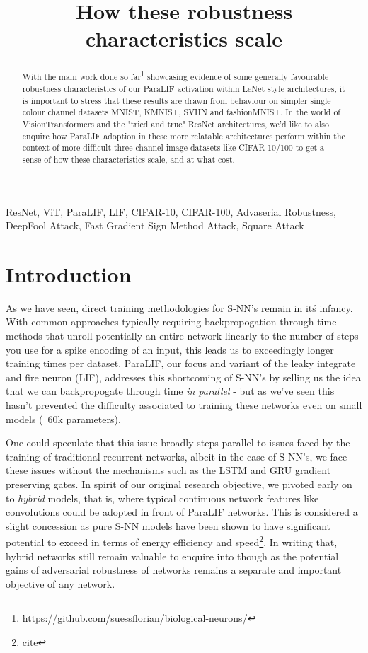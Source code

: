 \documentclass[conference]{IEEEtran}
\begin{document}
\title{How these robustness characteristics scale}

\author{
}

\maketitle

\begin{abstract}
With the main work done so far\footnote{\url{https://github.com/suessflorian/biological-neurons/}} showcasing evidence of some generally favourable robustness characteristics of our ParaLIF activation within LeNet style architectures, it is important to stress that these results are drawn from behaviour on simpler single colour channel datasets MNIST, KMNIST, SVHN and fashionMNIST. In the world of VisionTransformers and the "tried and true" ResNet architectures, we'd like to also enquire how ParaLIF adoption in these more relatable architectures perform within the context of more difficult three channel image datasets like CIFAR-10/100 to get a sense of how these characteristics scale, and at what cost.

\end{abstract}

\begin{IEEEkeywords}
ResNet, ViT, ParaLIF, LIF, CIFAR-10, CIFAR-100, Advaserial Robustness, DeepFool Attack, Fast Gradient Sign Method Attack, Square Attack
\end{IEEEkeywords}

\section{Introduction}
As we have seen, direct training methodologies for S-NN's remain in it\'s infancy. With common approaches typically requiring backpropogation through time methods that unroll potentially an entire network linearly to the number of steps you use for a spike encoding of an input, this leads us to exceedingly longer training times per dataset. ParaLIF, our focus and variant of the leaky integrate and fire neuron (LIF), addresses this shortcoming of S-NN's by selling us the idea that we can backpropogate through time \emph{in parallel} - but as we've seen this hasn't prevented the difficulty associated to training these networks even on small models (~60k parameters).

One could speculate that this issue broadly steps parallel to issues faced by the training of traditional recurrent networks, albeit in the case of S-NN's, we face these issues without the mechanisms such as the LSTM and GRU gradient preserving gates. In spirit of our original research objective, we pivoted early on to \emph{hybrid} models, that is, where typical continuous network features like convolutions could be adopted in front of ParaLIF networks. This is considered a slight concession as pure S-NN models have been shown to have significant potential to exceed in terms of energy efficiency and speed\footnote{cite}. In writing that, hybrid networks still remain valuable to enquire into though as the potential gains of adversarial robustness of networks remains a separate and important objective of any network.
\end{document}
